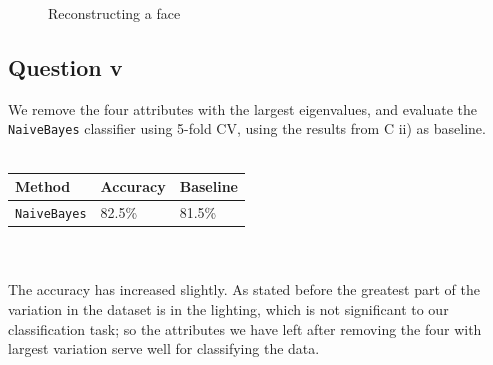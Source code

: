 \documentclass[a4paper]{article}
\begin{document}
\begin{figure}[!htbp]
\begin{center}
\end{center}
\caption{Reconstructing a face}
\label{fig:c4img1}
\end{figure}

\FloatBarrier

\subsection*{Question v}
We remove the four attributes with the largest eigenvalues, and evaluate the {\tt NaiveBayes} classifier using 5-fold CV, using the results from C ii) as baseline.\\
\\
\begin{tabular}{lll}
Method & Accuracy & Baseline \\
\hline
{\tt NaiveBayes} & 82.5\% & 81.5\% \\
\end{tabular}\\
\\
The accuracy has increased slightly. As stated before the greatest part of the variation in the dataset is in the lighting, which is not significant to our classification task; so the attributes we have left after removing the four with largest variation serve well for classifying the data.
\end{document}
